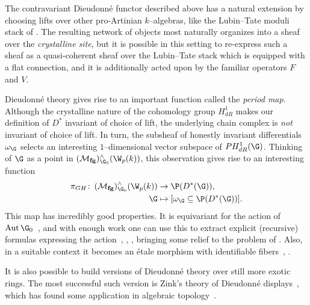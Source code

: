 \begin{remark}
The contravariant Dieudonn\'e functor described above has a natural extension by choosing lifts over other pro-Artinian $k$--algebras, like the Lubin--Tate moduli stack of .  The resulting network of objects most naturally organizes into a sheaf over the \textit{crystalline site}, but it is possible in this setting to re-express such a sheaf as a quasi-coherent sheaf over the Lubin--Tate stack which is equipped with a flat connection, and it is additionally acted upon by the familiar operators $F$ and $V$.
\end{remark}

\begin{remark}
Dieudonn\'e theory gives rise to an important function called the \textit{period map}.  Although the crystalline nature of the cohomology group $H^1_{dR}$ makes our definition of $D^*$ invariant of choice of lift, the underlying chain complex is \emph{not} invariant of choice of lift.  In turn, the subsheaf of honestly invariant differentials $\omega_{\G}$ selects an interesting $1$--dimensional vector subspace of $PH^1_{dR}(\G)$.  Thinking of $\G$ as a point in $(\moduli{fg})^\wedge_{\G_0}(\W_p(k))$, this observation gives rise to an interesting function
\begin{align*}
\pi_{GH}\co (\moduli{fg})^\wedge_{\G_0}(\W_p(k)) & \to \P(D^*(\G)), \\
\G & \mapsto [\omega_{\G} \subseteq \P(D^*(\G))].
\end{align*}
This map has incredibly good properties.  It is equivariant for the action of $\Aut \G_0$~\cite[Theorem 1]{HopkinsGrossAnnouncement}, and with enough work one can use this to extract explicit (recursive) formulas expressing the action~\cite{DevinatzHopkins}, \cite[Section 24]{StricklandFPFP}, \cite[Section 22]{HopkinsGrossEquivVBs}, bringing some relief to the problem of .  Also, in a suitable context it becomes an \'etale morphism with identifiable fibers~\cite[Theorem 1]{HopkinsGrossAnnouncement}, \cite[Sections 23-4]{HopkinsGrossEquivVBs}.
\end{remark}

\begin{remark}
It is also possible to build versions of Dieudonn\'e theory over still more exotic rings.  The most successful such version is Zink's theory of Dieudonn\'e displays~\cite{ZinkDisplays}, which has found some application in algebraic topology~\cite{LawsonDisplays}.
\end{remark}









